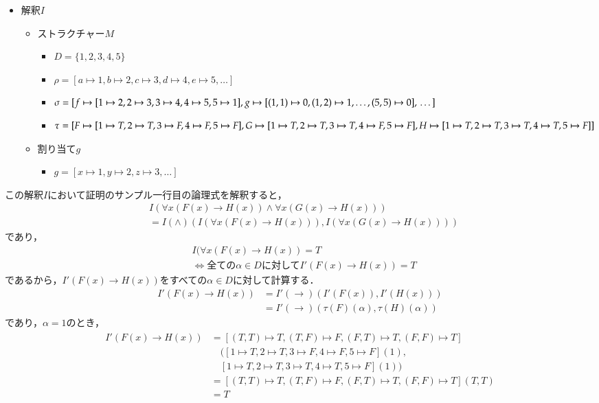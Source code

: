 \documentclass[10pt,b5paper,papersize,dvipdfmx]{jsbook}
\begin{document}
\begin{itemize}
\item 解釈$I$
\begin{itemize}
\item ストラクチャー$M$
\begin{itemize}
\item $D=\{1,2,3,4,5\}$
\item $\rho=[a\mapsto1,b\mapsto 2,c\mapsto 3,d\mapsto 4,e\mapsto 5,\dots]$
\item $\sigma=[\\
f\mapsto[1\mapsto 2,2\mapsto 3,3\mapsto 4,4\mapsto 5,5\mapsto 1], \\
g\mapsto[(1,1)\mapsto 0,(1,2)\mapsto 1,\dots,(5,5)\mapsto0], \\
\dots]$
\item $\tau=[\\
F\mapsto[1\mapsto T,2\mapsto T,3\mapsto F,4\mapsto F,5\mapsto F], \\
G\mapsto[1\mapsto T,2\mapsto T,3\mapsto T,4\mapsto F,5\mapsto F], \\
H\mapsto[1\mapsto T,2\mapsto T,3\mapsto T,4\mapsto T,5\mapsto F]\\]$
\end{itemize}
\item 割り当て$g$
\begin{itemize}
\item $g=[x\mapsto 1,y\mapsto 2,z\mapsto 3,\dots]$
\end{itemize}
\end{itemize}
\end{itemize}
この解釈$I$において証明のサンプル一行目の論理式を解釈すると，
\begin{align*}
&I(\forall x(F(x)\to H(x))\land \forall x(G(x)\to H(x)))\\
&=I(\land)(I(\forall x(F(x)\to H(x))),I(\forall x(G(x)\to H(x))))
\end{align*}
であり，
\begin{align*}
&I(\forall x(F(x)\to H(x))=T\\
&\Leftrightarrow \mbox{全ての}\alpha \in D\mbox{に対して}I'(F(x)\to H(x))=T
\end{align*}
であるから，$I'(F(x)\to H(x))$をすべての$\alpha \in D$に対して計算する．
\begin{align*}
I'(F(x)\to H(x))&=I'(\to)(I'(F(x)),I'(H(x)))\\
&=I'(\to)(\tau(F)(\alpha),\tau(H)(\alpha))
\end{align*}
であり，$\alpha=1$のとき，
\begin{align*}
\begin{split}
I'(F(x)\to H(x))&=[(T,T)\mapsto T,(T,F)\mapsto F,(F,T)\mapsto T,(F,F)\mapsto T]\\
&\quad([1\mapsto T,2\mapsto T,3\mapsto F,4\mapsto F,5\mapsto F](1), \\
&\quad[1\mapsto T,2\mapsto T,3\mapsto T,4\mapsto T,5\mapsto F](1))\\
&=[(T,T)\mapsto T,(T,F)\mapsto F,(F,T)\mapsto T,(F,F)\mapsto T](T,T)\\
&=T
\end{split}
\end{align*}
\end{document}
